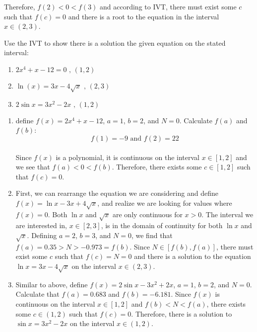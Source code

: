 Therefore, $f(2)<0<f(3)$ and according to IVT, there must exist some $c$ such 
that $f(c) = 0$ and there is a root to the equation in the interval $x \in 
\left(2, 3\right)$.

\begin{Exercise}
    [title=Intermediate Value Theorem Practice, label=IVTPrac]
    Use the IVT to show there is a solution the given equation on the stated 
    interval:\
    \begin{enumerate}
        \item $2x^4+x-12=0 \text{ , } \left(1, 2\right)$
        \item $\ln(x)=3x-4\sqrt{x}\text{ , } \left(2, 3\right)$
        \item $2\sin{x} = 3x^2-2x\text{ , } \left(1, 2\right)$
        \vspace{75mm}
    \end{enumerate}
\end{Exercise}
\begin{Answer}
    [ref=IVTPrac]
    \begin{enumerate}
        \item define $f(x)=2x^4+x-12$, $a=1$, $b=2$, and $N=0$. Calculate 
        $f(a)$ and $f(b)$:
        $$f(1)=-9 \text{ and } f(2)=22$$ \\
        Since $f(x)$ is a polynomial, it is continuous on the interval $x\in
        \left[1, 2\right]$ and we see that $f(a) < 0 < f(b)$. Therefore, there 
        exists some $c \in \left[1, 2\right]$ such that $f(c)=0$.\
        
        \item First, we can rearrange the equation we are considering and 
        define $f(x) = \ln{x} - 3x + 4\sqrt{x}$, and realize we are looking for 
        values where $f(x) = 0$. Both $\ln{x}$ and $\sqrt{x}$ are only continuous 
        for $x > 0$. The interval we are interested in, $x \in \left[2, 
        3\right]$, is in the domain of continuity for both $\ln{x}$ and 
        $\sqrt{x}$. Defining $a = 2$, $b = 3$, and $N = 0$, we find that $f(a) 
        = 0.35 > N > -0.973 = f(b)$. Since $N \in \left[f(b), f(a)\right]$, 
        there must exist some $c$ such that $f(c) = N = 0$ and there is a 
        solution to the equation $\ln{x} = 3x - 4\sqrt{x}$ on the interval $x 
        \in \left(2, 3\right)$.
        
        \item Similar to above, define $f(x) = 2\sin{x} - 3x^2 + 2x$, $a = 1$, 
        $b = 2$, and $N = 0$. Calculate that $f(a) = 0.683$ and $f(b) = -6.181$. 
        Since $f(x)$ is continuous on the interval $ x \in \left[1, 2\right]$ 
        and $f(b) < N < f(a)$, there exists some $c \in \left(1, 2 \right)$ 
        such that $f(c) = 0$. Therefore, there is a solution to $\sin{x} = 
        3x^2 - 2x$ on the interval $ x\in \left(1, 2\right)$.
    \end{enumerate}
\end{Answer}

